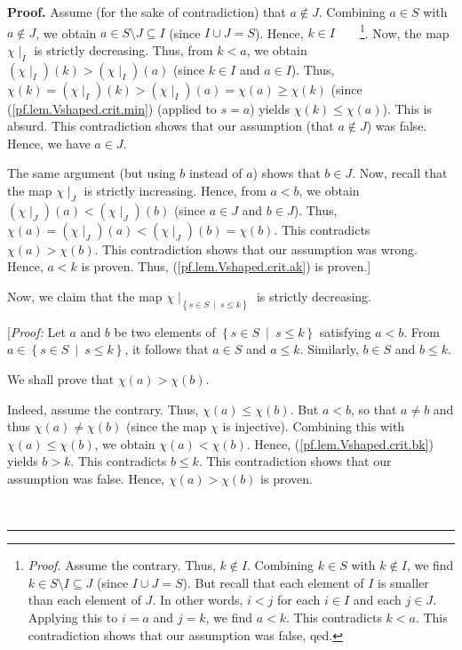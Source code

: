 \documentclass[numbers=enddot,12pt,final,onecolumn,notitlepage]{scrartcl}%
\theoremstyle{definition}
\newenvironment{proof}[1][Proof]{\noindent\textbf{#1.} }{\ \rule{0.5em}{0.5em}}
\newenvironment{verlong}{}{}
\begin{document}
\begin{verlong}
\begin{proof}
Assume (for the sake of contradiction) that $a\notin J$. Combining $a\in S$
with $a\notin J$, we obtain $a\in S\setminus J\subseteq I$ (since $I\cup
J=S$). Hence, $k\in I$\ \ \ \ \footnote{\textit{Proof.} Assume the contrary.
Thus, $k\notin I$. Combining $k\in S$ with $k\notin I$, we find $k\in
S\setminus I\subseteq J$ (since $I\cup J=S$). But recall that each element of
$I$ is smaller than each element of $J$. In other words, $i<j$ for each $i\in
I$ and each $j\in J$. Applying this to $i=a$ and $j=k$, we find $a<k$. This
contradicts $k<a$. This contradiction shows that our assumption was false,
qed.}. Now, the map $\chi\mid_{I}$ is strictly decreasing. Thus, from $k<a$,
we obtain $\left(  \chi\mid_{I}\right)  \left(  k\right)  >\left(  \chi
\mid_{I}\right)  \left(  a\right)  $ (since $k\in I$ and $a\in I$). Thus,
$\chi\left(  k\right)  =\left(  \chi\mid_{I}\right)  \left(  k\right)
>\left(  \chi\mid_{I}\right)  \left(  a\right)  =\chi\left(  a\right)
\geq\chi\left(  k\right)  $ (since (\ref{pf.lem.Vshaped.crit.min}) (applied to
$s=a$) yields $\chi\left(  k\right)  \leq\chi\left(  a\right)  $). This is
absurd. This contradiction shows that our assumption (that $a\notin J$) was
false. Hence, we have $a\in J$.

The same argument (but using $b$ instead of $a$) shows that $b\in J$. Now,
recall that the map $\chi\mid_{J}$ is strictly increasing. Hence, from $a<b$,
we obtain $\left(  \chi\mid_{J}\right)  \left(  a\right)  <\left(  \chi
\mid_{J}\right)  \left(  b\right)  $ (since $a\in J$ and $b\in J$). Thus,
$\chi\left(  a\right)  =\left(  \chi\mid_{J}\right)  \left(  a\right)
<\left(  \chi\mid_{J}\right)  \left(  b\right)  =\chi\left(  b\right)  $. This
contradicts $\chi\left(  a\right)  >\chi\left(  b\right)  $. This
contradiction shows that our assumption was wrong. Hence, $a<k$ is proven.
Thus, (\ref{pf.lem.Vshaped.crit.ak}) is proven.]

Now, we claim that the map $\chi\mid_{\left\{  s\in S\ \mid\ s\leq k\right\}
}$ is strictly decreasing.

[\textit{Proof:} Let $a$ and $b$ be two elements of $\left\{  s\in
S\ \mid\ s\leq k\right\}  $ satisfying $a<b$. From $a\in\left\{  s\in
S\ \mid\ s\leq k\right\}  $, it follows that $a\in S$ and $a\leq k$.
Similarly, $b\in S$ and $b\leq k$.

We shall prove that $\chi\left(  a\right)  >\chi\left(  b\right)  $.

Indeed, assume the contrary. Thus, $\chi\left(  a\right)  \leq\chi\left(
b\right)  $. But $a<b$, so that $a\neq b$ and thus $\chi\left(  a\right)
\neq\chi\left(  b\right)  $ (since the map $\chi$ is injective). Combining
this with $\chi\left(  a\right)  \leq\chi\left(  b\right)  $, we obtain
$\chi\left(  a\right)  <\chi\left(  b\right)  $. Hence,
(\ref{pf.lem.Vshaped.crit.bk}) yields $b>k$. This contradicts $b\leq k$. This
contradiction shows that our assumption was false. Hence, $\chi\left(
a\right)  >\chi\left(  b\right)  $ is proven.


\end{proof}
\end{verlong}
\end{document}
